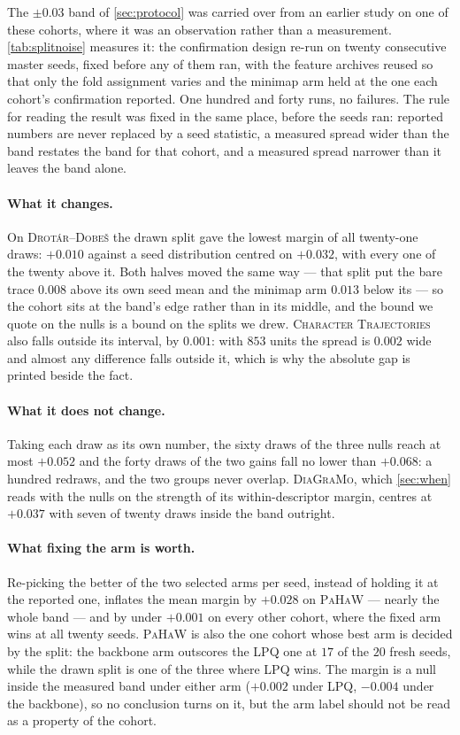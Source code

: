 \documentclass[10pt,a4paper]{article}
\begin{document}


The $\pm 0.03$ band of \cref{sec:protocol} was carried over from an earlier study on one of these
cohorts, where it was an observation rather than a measurement. \cref{tab:splitnoise} measures it:
the confirmation design re-run on twenty consecutive master seeds, fixed before any of them ran,
with the feature archives reused so that only the fold assignment varies and the minimap arm held
at the one each cohort's confirmation reported. One hundred and forty runs, no failures. The rule
for reading the result was fixed in the same place, before the seeds ran: reported numbers are
never replaced by a seed statistic, a measured spread wider than the band restates the band for
that cohort, and a measured spread narrower than it leaves the band alone.

\paragraph{What it changes.} On \textsc{Drot\'ar--Dobe\v{s}} the drawn split gave the lowest margin
of all twenty-one draws: $+0.010$ against a seed distribution centred on $+0.032$, with every one
of the twenty above it. Both halves moved the same way --- that split put the bare trace $0.008$
above its own seed mean and the minimap arm $0.013$ below its --- so the cohort sits at the band's
edge rather than in its middle, and the bound we quote on the nulls is a bound on the splits we
drew. \textsc{Character Trajectories} also falls outside its interval, by $0.001$: with $853$ units
the spread is $0.002$ wide and almost any difference falls outside it, which is why the absolute
gap is printed beside the fact.

\paragraph{What it does not change.} Taking each draw as its own number, the sixty draws of the
three nulls reach at most $+0.052$ and the forty draws of the two gains fall no lower than
$+0.068$: a hundred redraws, and the two groups never overlap. \textsc{DiaGraMo}, which
\cref{sec:when} reads with the nulls on the strength of its within-descriptor margin, centres at
$+0.037$ with seven of twenty draws inside the band outright.

\paragraph{What fixing the arm is worth.} Re-picking the better of the two selected arms per seed,
instead of holding it at the reported one, inflates the mean margin by $+0.028$ on \textsc{PaHaW}
--- nearly the whole band --- and by under $+0.001$ on every other cohort, where the fixed arm wins
at all twenty seeds. \textsc{PaHaW} is also the one cohort whose best arm is decided by the split:
the backbone arm outscores the LPQ one at $17$ of the $20$ fresh seeds, while the drawn split is
one of the three where LPQ wins. The margin is a null inside the measured band under either arm
($+0.002$ under LPQ, $-0.004$ under the backbone), so no conclusion turns on it, but the arm label
should not be read as a property of the cohort.
\end{document}
